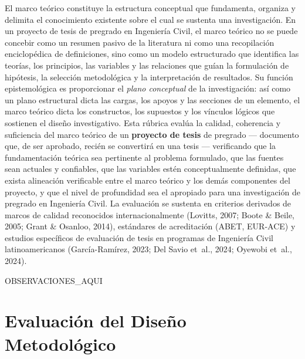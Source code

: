 \documentclass[12pt,a4paper]{report}
\begin{document}
El marco teórico constituye la estructura conceptual que fundamenta, organiza y delimita el conocimiento existente sobre el cual se sustenta una investigación. En un proyecto de tesis de pregrado en Ingeniería Civil, el marco teórico no se puede concebir como un resumen pasivo de la literatura ni como una recopilación enciclopédica de definiciones, sino como un modelo estructurado que identifica las teorías, los principios, las variables y las relaciones que guían la formulación de hipótesis, la selección metodológica y la interpretación de resultados. Su función epistemológica es proporcionar el \textit{plano conceptual} de la investigación: así como un plano estructural dicta las cargas, los apoyos y las secciones de un elemento, el marco teórico dicta los constructos, los supuestos y los vínculos lógicos que sostienen el diseño investigativo. Esta rúbrica evalúa la calidad, coherencia y suficiencia del marco teórico de un \textbf{proyecto de tesis} de pregrado --- documento que, de ser aprobado, recién se convertirá en una tesis --- verificando que la fundamentación teórica sea pertinente al problema formulado, que las fuentes sean actuales y confiables, que las variables estén conceptualmente definidas, que exista alineación verificable entre el marco teórico y los demás componentes del proyecto, y que el nivel de profundidad sea el apropiado para una investigación de pregrado en Ingeniería Civil. La evaluación se sustenta en criterios derivados de marcos de calidad reconocidos internacionalmente (Lovitts, 2007; Boote \& Beile, 2005; Grant \& Osanloo, 2014), estándares de acreditación (ABET, EUR-ACE) y estudios específicos de evaluación de tesis en programas de Ingeniería Civil latinoamericanos (García-Ramírez, 2023; Del Savio et~al., 2024; Oyewobi et~al., 2024).



{{OBSERVACIONES_AQUI}}


\section{Evaluación del Diseño Metodológico}
\end{document}
